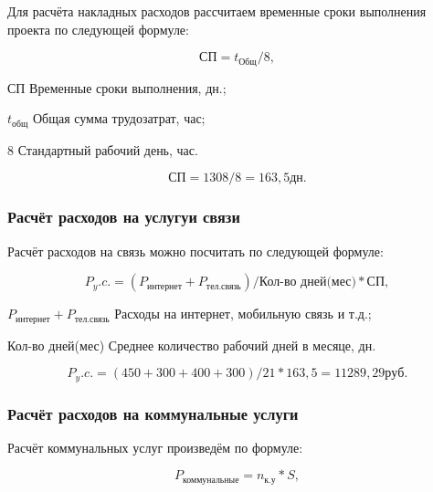 Для расчёта накладных расходов рассчитаем временные сроки выполнения проекта по следующей
формуле:

\begin{equation}
    \text{СП} = t_\text{Общ} / 8,
\end{equation}

\begin{eqexpl}[25mm]
    \item{СП} Временные сроки выполнения, дн.;
    \item{$t_\text{общ}$} Общая сумма трудозатрат, час;
    \item{8} Стандартный рабочий день, час.
\end{eqexpl}

\begin{equation*}
    \text{СП} = 1308 / 8 = 163,5 дн.
\end{equation*}

\subsubsection{Расчёт расходов на услугуи связи}

Расчёт расходов на связь можно посчитать по следующей формуле:

\begin{equation}
    P_y.c. = (P_\text{интернет} + P_\text{тел.связь}) / \text{Кол-во дней(мес)} * \text{СП},
\end{equation}

\begin{eqexpl}[57mm]
    \item{$P_\text{интернет} + P_\text{тел.связь}$} Расходы на интернет, мобильную связь и т.д.;
    \item{Кол-во дней(мес)} Среднее количество рабочий дней в месяце, дн.
\end{eqexpl}

\begin{equation*}
    P_y.c. = (450 + 300 + 400 + 300) / 21 * 163,5 = 11289,29 руб.
\end{equation*}

\subsubsection{Расчёт расходов на коммунальные услуги}

Расчёт коммунальных услуг произведём по формуле:

\begin{equation}
    P_\text{коммунальные} = n_\text{к.у} * S,
\end{equation}

